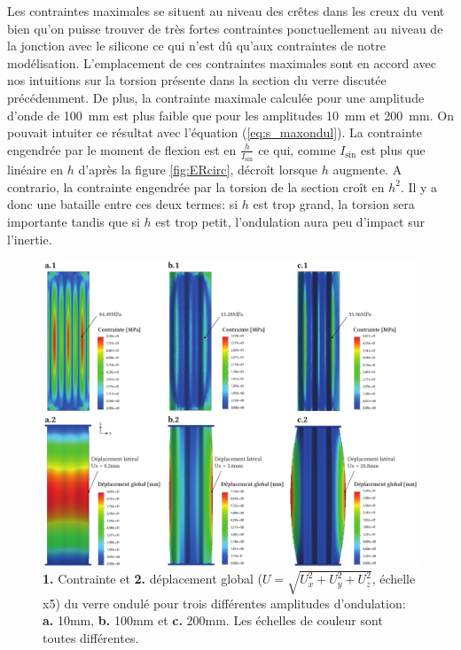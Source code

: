 \documentclass[11pt,titlepage]{article}
\begin{document}
Les contraintes maximales se situent au niveau des crêtes dans les creux du vent bien qu'on puisse trouver de très fortes contraintes ponctuellement au niveau de la jonction avec le silicone ce qui n'est dû qu'aux contraintes de notre modélisation. L'emplacement de ces contraintes maximales sont en accord avec nos intuitions sur la torsion présente dans la section du verre discutée précédemment. De plus, la contrainte maximale calculée pour une amplitude d'onde de \qty{100}{\milli\meter} est plus faible que pour les amplitudes \qty{10}{\milli\meter} et \qty{200}{\milli\meter}. On pouvait intuiter ce résultat avec l'équation (\ref{eq:s_maxondul}). La contrainte engendrée par le moment de flexion est en $\frac{h}{I_{\text{sin}}}$ ce qui, comme $I_{\text{sin}}$ est plus que linéaire en $h$ d'après la figure \ref{fig:ERcirc}, décroît lorsque $h$ augmente. A contrario, la contrainte engendrée par la torsion de la section croît en $h^2$. Il y a donc une bataille entre ces deux termes: si $h$ est trop grand, la torsion sera importante tandis que si $h$ est trop petit, l'ondulation aura peu d'impact sur l'inertie.

\begin{figure}[H]
    \centering
    \includegraphics[width=\linewidth]{img/ondul/fem/FEM1.pdf}
    \caption{\textbf{1.} Contrainte et \textbf{2.} déplacement global ($U = \sqrt{U_x^2 + U_y^2 + U_z^2}$, échelle x5) du verre ondulé pour trois différentes amplitudes d'ondulation: \textbf{a.} 10mm, \textbf{b.} 100mm et \textbf{c.} 200mm. Les échelles de couleur sont toutes différentes.}
    \label{fig:ondulfemscreen}
\end{figure}
\end{document}
